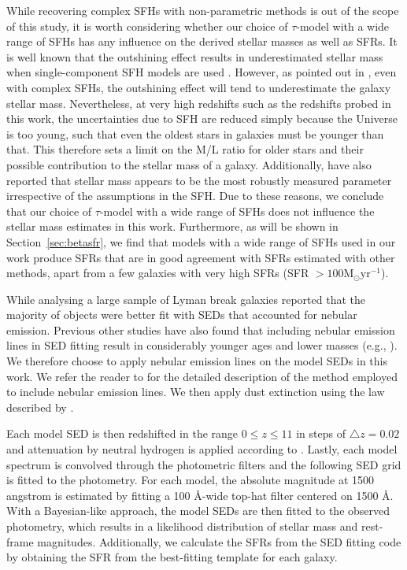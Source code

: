 \documentclass[twocolumn]{aastex63}
\begin{document}
While recovering complex SFHs with non-parametric methods is out of the scope of this study, it is worth considering whether our choice of $\tau$-model with a wide range of SFHs has any influence on the derived stellar masses as well as SFRs. It is well known that the outshining effect results in underestimated stellar mass when single-component SFH models are used \citep{Papovich2001}. However, as pointed out in \citet{Madau2014}, even with complex SFHs, the outshining effect will tend to underestimate the galaxy stellar mass. Nevertheless, at very high redshifts such as the redshifts probed in this work, the uncertainties due to SFH are reduced simply because the Universe is too young, such that even the oldest stars in galaxies must be younger than that. This therefore sets a limit on the M/L ratio for older stars and their possible contribution to the stellar mass of a galaxy. Additionally, \citet{Lee2010} have also reported that stellar mass appears to be the most robustly measured parameter irrespective of the assumptions in the SFH. Due to these reasons, we conclude that our choice of $\tau$-model with a wide range of SFHs does not influence the stellar mass estimates in this work. Furthermore, as will be shown in Section~\ref{sec:betasfr}, we find that models with a wide range of SFHs used in our work produce SFRs that are in good agreement with SFRs estimated with other methods, apart from a few galaxies with very high SFRs (SFR $>100\mathrm{M_{\odot}yr^{-1}}$). 

While analysing a large sample of Lyman break galaxies \citet{Schaerer2012} reported that the majority of objects were better fit with SEDs that accounted for nebular emission. Previous other studies have also found that including nebular emission lines in SED fitting result in considerably younger ages and lower masses (e.g., \citealt{Schaerer2009, Schaerer2010, Ono2010,McLure2011, Duncan2014}). We therefore choose to apply nebular emission lines on the model SEDs in this work. We refer the reader to \citet{Duncan2014} for the detailed description of the method employed to include nebular emission lines. We then apply dust extinction using the law described by \citet{Calzetti2000}.

Each model SED is then redshifted in the range $0\leq z\leq11$ in steps of $\triangle z=0.02$ and attenuation by neutral hydrogen is applied according to \citet{Madau1995}. Lastly, each model spectrum is convolved through the photometric filters and the following SED grid is fitted to the photometry. For each model, the absolute magnitude at 1500 angstrom is estimated by fitting a 100 \AA -wide top-hat filter centered on 1500 \AA. With a Bayesian-like approach, the model SEDs are then fitted to the observed photometry, which results in a likelihood distribution of stellar mass and rest-frame magnitudes. Additionally, we calculate the SFRs from the SED fitting code by obtaining the SFR from the best-fitting template for each galaxy.
\end{document}
